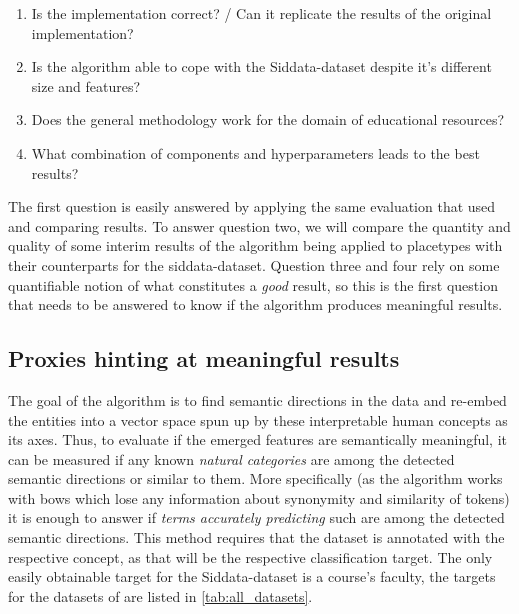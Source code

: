 \begin{enumerate}
	\item[\saveref{sec:results_placetypes}{1.}] Is the implementation correct? / Can it replicate the results of the original implementation?
	\item[\saveref{sec:results_datasetdiffs}{2.}] Is the algorithm able to cope with the Siddata-dataset despite it's different size and features?
	\item[\saveref{sec:results_siddata}{3.}] Does the general methodology work for the domain of educational resources?
	\item[\saveref{sec:results_params}{4.}] What combination of components and hyperparameters leads to the best results?
\end{enumerate}

The first question is easily answered by applying the same evaluation that \mainalgos used and comparing results. To answer question two, we will compare the quantity and quality of some interim results of the algorithm being applied to placetypes with their counterparts for the siddata-dataset. Question three and four rely on some quantifiable notion of what constitutes a \emph{good} result, so this is the first question that needs to be answered to know if the algorithm produces meaningful results.

\subsection{Proxies hinting at meaningful results}

The goal of the algorithm is to find semantic directions in the data and re-embed the entities into a vector space spun up by these interpretable human concepts as its axes. Thus, to evaluate if the emerged features are semantically meaningful, it can be measured if any known \textit{natural categories} are among the detected semantic directions or similar to them. More specifically (as the algorithm works with \glspl{bow} which lose any information about synonymity and similarity of tokens) %
it is enough to answer if \emph{terms accurately predicting} such are among the detected semantic directions. This method requires that the dataset is annotated with the respective concept, as that will be the respective classification target. The only easily obtainable target for the Siddata-dataset is a course's faculty, the targets for the datasets of \mainalgos are listed in \autoref{tab:all_datasets}.

